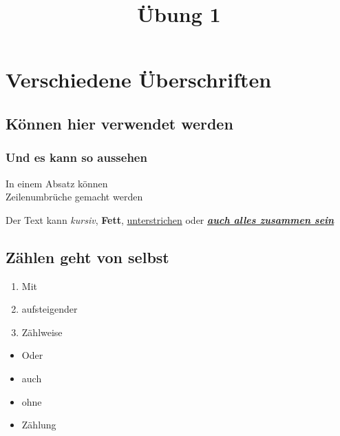 \documentclass[11pt, a4paper]{article}
\title{Übung 1}
\author{}
\date{}
\begin{document}
\maketitle
\tableofcontents

\section{Verschiedene Überschriften}
\subsection{Können hier verwendet werden}
\subsubsection{Und es kann so aussehen}

In einem Absatz können \\ Zeilenumbrüche gemacht werden

\noindent Der Text kann \textit{kursiv}, \textbf{Fett}, \underline{unterstrichen} oder \textbf{\textit{\underline{auch alles zusammen sein}}}
 
\subsection{Zählen geht von selbst}

\begin{enumerate}
\item Mit
\item aufsteigender
\item Zählweise
\end{enumerate}

\begin{itemize}
\item Oder
\item auch
\item ohne
\item Zählung
\end{itemize}
 
\end{document}
